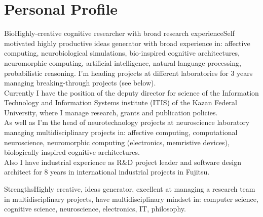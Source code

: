 \documentclass{moderncv}
\begin{document}
%
\makecvtitle

 
\section{Personal Profile}

\cventry
    {Bio}{Highly-creative cognitive researcher with broad research experience}{}{}{}{Self motivated highly productive ideas generator with broad experience in: affective computing, neurobiological simulations, bio-inspired cognitive architectures, neuromorphic computing, artificial intelligence, natural language processing, probabilistic reasoning. I'm heading projects at different laboratories for 3 years managing breaking-through projects (see below).\\
      Currently I have the position of the deputy director for science of the Information Technology and Information Systems institute (ITIS) of the Kazan Federal University, where I manage research, grants and publication policies.\\
      As well as I'm the head of neurotechnology projects at neuroscience laboratory managing multidisciplinary projects in: affective computing, computational neuroscience, neuromorphic computing (electronics, memristive devices), biologically inspired cognitive architectures.\\
      Also I have industrial experience as R\&D project leader and software design architect for 8 years in international industrial projects in Fujitsu.}

\cvitem
    {Strengths}{\small Highly creative, ideas generator, excellent at managing a research team in multidisciplinary projects, have multidisciplinary mindset in: computer science, cognitive science, neuroscience, electronics, IT, philosophy.}
\end{document}
